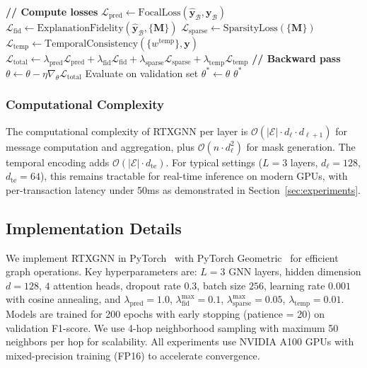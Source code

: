 \begin{algorithm}[ht!]
\begin{algorithmic}[1]
        \STATE \textbf{// Compute losses}
        \STATE $\mathcal{L}_{\text{pred}} \gets \text{FocalLoss}(\hat{\mathbf{y}}_{\mathcal{B}}, \mathbf{y}_{\mathcal{B}})$
        \STATE $\mathcal{L}_{\text{fid}} \gets \text{ExplanationFidelity}(\hat{\mathbf{y}}_{\mathcal{B}}, \{\mathbf{M}\})$
        \STATE $\mathcal{L}_{\text{sparse}} \gets \text{SparsityLoss}(\{\mathbf{M}\})$
        \STATE $\mathcal{L}_{\text{temp}} \gets \text{TemporalConsistency}(\{w^{\text{temp}}\}, \mathbf{y})$
        \STATE $\mathcal{L}_{\text{total}} \gets \lambda_{\text{pred}} \mathcal{L}_{\text{pred}} + \lambda_{\text{fid}} \mathcal{L}_{\text{fid}} + \lambda_{\text{sparse}} \mathcal{L}_{\text{sparse}} + \lambda_{\text{temp}} \mathcal{L}_{\text{temp}}$
        \STATE \textbf{// Backward pass}
        \STATE $\theta \gets \theta - \eta \nabla_\theta \mathcal{L}_{\text{total}}$ 
    \ENDFOR
    \STATE Evaluate on validation set
        \STATE $\theta^* \gets \theta$ 
    \ENDIF
\ENDFOR
\RETURN $\theta^*$
\end{algorithmic}
\end{algorithm}

\subsubsection{Computational Complexity}

The computational complexity of RTXGNN per layer is $\mathcal{O}(|\mathcal{E}| \cdot d_\ell \cdot d_{\ell+1})$ for message computation and aggregation, plus $\mathcal{O}(n \cdot d_\ell^2)$ for mask generation. The temporal encoding adds $\mathcal{O}(|\mathcal{E}| \cdot d_{\text{te}})$. For typical settings ($L = 3$ layers, $d_\ell = 128$, $d_{\text{te}} = 64$), this remains tractable for real-time inference on modern GPUs, with per-transaction latency under 50ms as demonstrated in Section~\ref{sec:experiments}.

\subsection{Implementation Details}
\label{subsec:implementation}

We implement RTXGNN in PyTorch~\citep{paszke2019pytorch} with PyTorch Geometric~\citep{fey2019fast} for efficient graph operations. Key hyperparameters are: $L = 3$ GNN layers, hidden dimension $d = 128$, $4$ attention heads, dropout rate $0.3$, batch size $256$, learning rate $0.001$ with cosine annealing, and $\lambda_{\text{pred}} = 1.0$, $\lambda_{\text{fid}}^{\max} = 0.1$, $\lambda_{\text{sparse}}^{\max} = 0.05$, $\lambda_{\text{temp}} = 0.01$. Models are trained for 200 epochs with early stopping (patience = 20) on validation F1-score. We use 4-hop neighborhood sampling with maximum 50 neighbors per hop for scalability. All experiments use NVIDIA A100 GPUs with mixed-precision training (FP16) to accelerate convergence.

